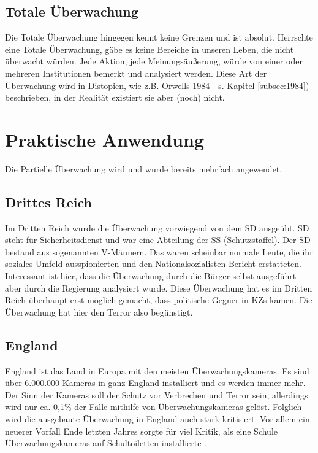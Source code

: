 \documentclass{article}
\begin{document}
\subsection{Totale Überwachung}
Die Totale Überwachung hingegen kennt keine Grenzen und ist absolut. Herrschte eine Totale Überwachung, gäbe es keine Bereiche in unseren Leben, die nicht überwacht würden. Jede Aktion, jede Meinungsäußerung, würde von einer oder mehreren Institutionen bemerkt und analysiert werden. Diese Art der Überwachung wird in Distopien, wie z.B. Orwells 1984 - s. Kapitel \ref{subsec:1984}) beschrieben, in der Realität existiert sie aber (noch) nicht.

\section{Praktische Anwendung}
Die Partielle Überwachung wird und wurde bereits mehrfach angewendet.

\subsection{Drittes Reich\autocite{DrittesReich}}
Im Dritten Reich wurde die Überwachung vorwiegend von dem SD ausgeübt. SD steht für Sicherheitsdienst und war eine Abteilung der SS (Schutzstaffel). Der SD bestand aus sogenannten V-Männern. Das waren scheinbar normale Leute, die ihr soziales Umfeld ausspionierten und den Nationalsozialisten Bericht erstatteten. Interessant ist hier, dass die Überwachung durch die Bürger selbst ausgeführt aber durch die Regierung analysiert wurde. Diese Überwachung hat es im Dritten Reich überhaupt erst möglich gemacht, dass politische Gegner in KZs kamen. Die Überwachung hat hier den Terror also begünstigt.

\subsection[England]{England\autocite{England}}
England ist das Land in Europa mit den meisten Überwachungskameras. Es sind über 6.000.000 Kameras in ganz England installiert und es werden immer mehr. Der Sinn der Kameras soll der Schutz vor Verbrechen und Terror sein, allerdings wird nur ca. 0,1\% der Fälle mithilfe von Überwachungskameras gelöst. Folglich wird die ausgebaute Überwachung in England auch stark kritisiert. Vor allem ein neuerer Vorfall Ende letzten Jahres sorgte für viel Kritik, als eine Schule Überwachungskameras auf Schultoiletten installierte \autocite{Toilette}.
\end{document}
